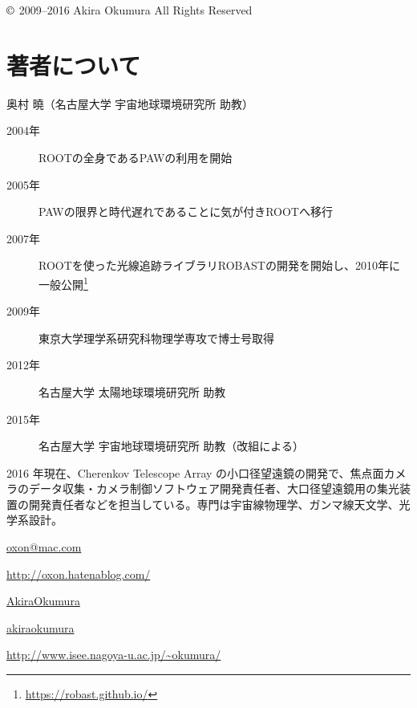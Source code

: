 \documentclass[oneside]{jsbook}
\makeatletter
\def\@listoflistenv{[NoFloat][listings][lstlisting]}
\newif\if@expire@floats \@expire@floatsfalse
\def\begin#1{%
   \@ifundefined{#1}%
      {\def\reserved@a{\@latex@error{Environment #1 undefined}\@eha}}%
      {\def\reserved@a{\def\@currenvir{#1}%
          \edef\@currenvline{\on@line}%
          \@check@listenv
          \csname #1\endcsname}}%
       \@ignorefalse
   \begingroup\@endpefalse\reserved@a}
\def\@check@listenv{%
   \@expandtwoargs\in@{[\@currenvir]}{\@listoflistenv}%
   \ifin@ \@expire@floatstrue \fi}
\makeatother
\begin{document}
\begin{flushright}
$\copyright$ 2009--2016 Akira Okumura All Rights Reserved
\end{flushright}

\pagebreak

\section*{著者について}
{\large 奥村 曉（名古屋大学 宇宙地球環境研究所 助教）}
         
\begin{description}
  \item[\quad2004年]ROOTの全身であるPAWの利用を開始
  \item[\quad2005年]PAWの限界と時代遅れであることに気が付きROOTへ移行
  \item[\quad2007年]ROOTを使った光線追跡ライブラリROBASTの開発を開始し、2010年に一般公開\footnote{\url{https://robast.github.io/}}
  \item[\quad2009年]東京大学理学系研究科物理学専攻で博士号取得
  \item[\quad2012年]名古屋大学 太陽地球環境研究所 助教
  \item[\quad2015年]名古屋大学 宇宙地球環境研究所 助教（改組による）
\end{description}

2016 年現在、Cherenkov Telescope Array の小口径望遠鏡の開発で、焦点面カメラのデータ収集・カメラ制御ソフトウェア開発責任者、大口径望遠鏡用の集光装置の開発責任者などを担当している。専門は宇宙線物理学、ガンマ線天文学、光学系設計。

\begin{description}[labelwidth=2.cm]
  \item[\quad 電子メール]\url{oxon@mac.com}
  \item[\quad blog]\url{http://oxon.hatenablog.com/}
  \item[\quad Twitter]\href{https://twitter.com/AkiraOkumura}{AkiraOkumura}
  \item[\quad Flickr]\href{https://www.flickr.com/photos/akiraokumura/}{akiraokumura}
  \item[\quad 個人ページ]\url{http://www.isee.nagoya-u.ac.jp/~okumura/}
\end{description}

\tableofcontents
\mainmatter











\end{document}
